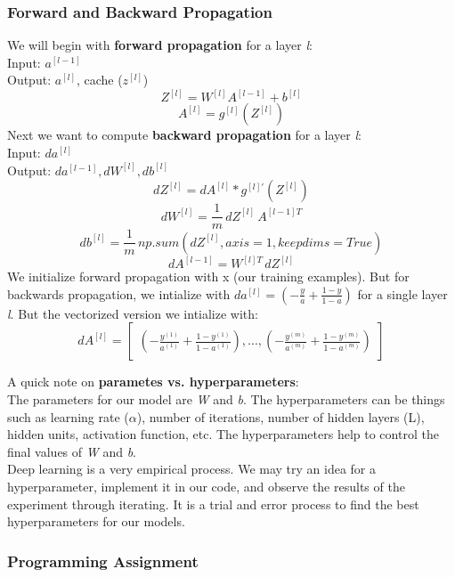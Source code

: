 \documentclass[11pt, a4paper]{article}
\begin{document}
\begin{spacing}{1.1}
	\subsubsection{Forward and Backward Propagation}
	We will begin with \textbf{forward propagation} for a layer \textit{l}: \vspace*{1mm} \\
	\hspace*{5mm} Input: $a^{[l-1]}$ \\
	\hspace*{5mm} Output: $a^{[l]}$, cache ($z^{[l]}$)
	$$ Z^{[l]} = W^{[l]}A^{[l-1]}+b^{[l]}$$ $$ A^{[l]} = g^{[l]}(Z^{[l]})$$ 
	Next we want to compute \textbf{backward propagation} for a layer \textit{l}: \vspace*{1mm} \\
	\hspace*{5mm} Input: $da^{[l]}$ \\
	\hspace*{5mm} Output: $da^{[l-1]}, dW^{[l]}, db^{[l]}$
	$$dZ^{[l]} = dA^{[l]}* g^{[l]\prime}(Z^{[l]})$$ $$ dW^{[l]} = \frac{1}{m}\, dZ^{[l]}\, A^{[l-1]T}$$ $$ db^{[l]} = \frac{1}{m}\, np.sum(dZ^{[l]}, axis=1, keepdims=True)$$ $$ dA^{[l-1]} = W^{[l]T}\,dZ^{[l]}$$ 
	We initialize forward propagation with x (our training examples). But for backwards propagation, we intialize with $da^{[l]} = (-\frac{y}{a} + \frac{1-y}{1-a})$ for a single layer \textit{l}. But the vectorized version we intialize with: $$ dA^{[l]} = \begin{bmatrix} (-\frac{y^{(1)}}{a^{(1)}} + \frac{1-y^{(1)}}{1-a^{(1)}}),..., (-\frac{y^{(m)}}{a^{(m)}} + \frac{1-y^{(m)}}{1-a^{(m)}}) \end{bmatrix}  $$ \newpage

	\noindent A quick note on \textbf{parametes vs. hyperparameters}: \vspace*{1mm} \\
	The parameters for our model are \textit{W} and \textit{b}. The hyperparameters can be things such as learning rate ($\alpha$), number of iterations, number of hidden layers (L), hidden units, activation function, etc. The hyperparameters help to control the final values of \textit{W} and \textit{b}. \vspace*{2mm}\\
	Deep learning is a very empirical process. We may try an idea for a hyperparameter, implement it in our code, and observe the results of the experiment through iterating. It is a trial and error process to find the best hyperparameters for our models. 
	
	\subsubsection{Programming Assignment}
	
	
	
	
	
	
	
	
	
	
	
	
	
	
	
	
	
	
	
	
	
\end{spacing}
\end{document}
